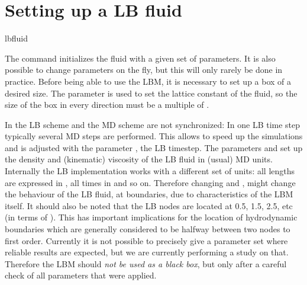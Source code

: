 \section{Setting up a LB fluid}
\begin{essyntax}
  lbfluid
  \begin{features}
  \end{features}
\end{essyntax}
The  command initializes the fluid with a given
set of parameters. It is also possible to change parameters on the
fly, but this will only rarely be done in practice. Before being able
to use the LBM, it is necessary to set up a box of a desired size. The
parameter  is used to set the lattice constant of the
fluid, so the size of the box in every direction must be a multiple of
.

In \es the LB scheme and the MD scheme are not synchronized: In one LB
time step typically several MD steps are performed. This allows to
speed up the simulations and is adjusted with the parameter ,
the LB timestep.
The parameters  and  set up the density and
(kinematic) viscosity of the LB fluid in (usual) MD units.  Internally the LB
implementation works with a different set of units: all lengths are
expressed in , all times in  and so on.  Therefore
changing  and , might change the behaviour of the
LB fluid, \eg at boundaries, due to characteristics of the LBM
itself. It should also be noted that the LB nodes are located at 0.5, 1.5, 2.5, etc (in terms of ).
This has important implications for the location of hydrodynamic boundaries which are generally considered
to be halfway between two nodes to first order.
Currently it is not possible to precisely give a parameter set
where reliable results are expected, but we are currently performing a
study on that. Therefore the LBM should \emph{not be used as a black
  box}, but only after a careful check of all parameters that were
applied. 

